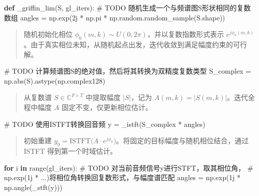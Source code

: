 \documentclass[
  english,
  letterpaper,
  DIV=11,
  numbers=noendperiod]{scrartcl}
\newenvironment{Shaded}{\begin{snugshade}}{\end{snugshade}}
\newcommand{\AlertTok}[1]{\textcolor[rgb]{0.68,0.00,0.00}{#1}}
\newcommand{\BuiltInTok}[1]{\textcolor[rgb]{0.00,0.23,0.31}{#1}}
\newcommand{\CommentTok}[1]{\textcolor[rgb]{0.37,0.37,0.37}{#1}}
\newcommand{\ControlFlowTok}[1]{\textcolor[rgb]{0.00,0.23,0.31}{\textbf{#1}}}
\newcommand{\KeywordTok}[1]{\textcolor[rgb]{0.00,0.23,0.31}{\textbf{#1}}}
\newcommand{\NormalTok}[1]{\textcolor[rgb]{0.00,0.23,0.31}{#1}}
\newcommand{\OperatorTok}[1]{\textcolor[rgb]{0.37,0.37,0.37}{#1}}
\newcommand{\OtherTok}[1]{\textcolor[rgb]{0.00,0.23,0.31}{#1}}
\begin{document}
\begin{Shaded}
\begin{Highlighting}[]
\KeywordTok{def}\NormalTok{ \_griffin\_lim(S, gl\_iters):}
    \CommentTok{\# }\AlertTok{TODO}\CommentTok{ 随机生成一个与频谱图S形状相同的复数数组}
\NormalTok{    angles }\OperatorTok{=}\NormalTok{ np.exp(}\OtherTok{2j} \OperatorTok{*}\NormalTok{ np.pi }\OperatorTok{*}\NormalTok{ np.random.random\_sample(S.shape))}
\end{Highlighting}
\end{Shaded}

\begin{quote}
随机初始化相位 \(\phi_0(m,k) \sim U(0, 2\pi)\)，并以复数指数形式表示
\(e^{j\phi_0(m,k)}\)。由于真实相位未知，从随机起点出发，迭代收敛到满足幅度约束的可行解。
\end{quote}

\begin{Shaded}
\begin{Highlighting}[]
    \CommentTok{\# }\AlertTok{TODO}\CommentTok{ 计算频谱图S的绝对值，然后将其转换为双精度复数类型}
\NormalTok{    S\_complex }\OperatorTok{=}\NormalTok{ np.}\BuiltInTok{abs}\NormalTok{(S).astype(np.complex128)}
\end{Highlighting}
\end{Shaded}

\begin{quote}
从复数谱 \(S \in \mathbb{C}^{F \times T}\) 中提取幅度 \(|S|\)，记为
\(A(m,k) = |S(m,k)|\)。迭代全程中幅度 \(A\) 固定不变，仅更新相位估计。
\end{quote}

\begin{Shaded}
\begin{Highlighting}[]
    \CommentTok{\# }\AlertTok{TODO}\CommentTok{ 使用ISTFT转换回音频}
\NormalTok{    y }\OperatorTok{=}\NormalTok{ \_istft(S\_complex }\OperatorTok{*}\NormalTok{ angles)}
\end{Highlighting}
\end{Shaded}

\begin{quote}
初始重建
\(y_0 = \text{ISTFT}\big(A \cdot e^{j\phi_0}\big)\)。将固定的目标幅度与随机相位结合，通过
ISTFT 得到第一个时域估计。
\end{quote}

\begin{Shaded}
\begin{Highlighting}[]
    \ControlFlowTok{for}\NormalTok{ i }\KeywordTok{in} \BuiltInTok{range}\NormalTok{(gl\_iters):}
        \CommentTok{\# }\AlertTok{TODO}\CommentTok{ 对当前音频信号y进行STFT，取其相位角，}
        \CommentTok{\# np.exp(1j * ...)将相位角转换回复数形式，与幅度谱匹配}
\NormalTok{        angles }\OperatorTok{=}\NormalTok{ np.exp(}\OtherTok{1j} \OperatorTok{*}\NormalTok{ np.angle(\_stft(y)))}
\end{Highlighting}
\end{Shaded}
\end{document}
